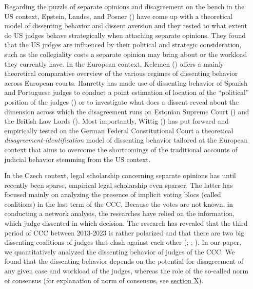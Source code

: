 \documentclass[
  11pt,
]{article}
\begin{document}
Regarding the puzzle of separate opinions and disagreement on the bench in the US context, Epstein, Landes, and Posner () have come up with a theoretical model of dissenting behavior and dissent aversion and they tested to what extent do US judges behave strategically when attaching separate opinions. They found that the US judges are influenced by their political and strategic consideration, such as the collegiality costs a separate opinion may bring about or the workload they currently have. In the European context, Kelemen () offers a mainly theoretical comparative overview of the various regimes of dissenting behavior across European courts. Hanretty has made use of dissenting behavior of Spanish and Portuguese judges to conduct a point estimation of location of the ``political'' position of the judges () or to investigate what does a dissent reveal about the dimension across which the disagreement runs on Estonian Supreme Court () and the British Law Lords (). Most importantly, Wittig () has put forward and empirically tested on the German Federal Constitutional Court a theoretical \emph{disagreement-identification} model of dissenting behavior tailored at the European context that aims to overcome the shortcomings of the traditional accounts of judicial behavior stemming from the US context.

In the Czech context, legal scholarship concerning separate opinions has until recently been sparse, empirical legal scholarship even sparser. The latter has focused mainly on analyzing the presence of implicit voting blocs (called coalitions) in the last term of the CCC. Because the votes are not known, in conducting a network analysis, the researches have relied on the information, which judge dissented in which decision. The research has revealed that the third period of CCC between 2013-2023 is rather polarized and that there are two big dissenting coalitions of judges that clash against each other (; ; ). In our paper, we quantitatively analyzed the dissenting behavior of judges of the CCC. We found that the dissenting behavior depends on the potential for disagreement of any given case and workload of the judges, whereas the role of the so-called norm of consensus (for explanation of norm of consensus, see \hyperref[identification-disagreement]{section X}).
\end{document}
